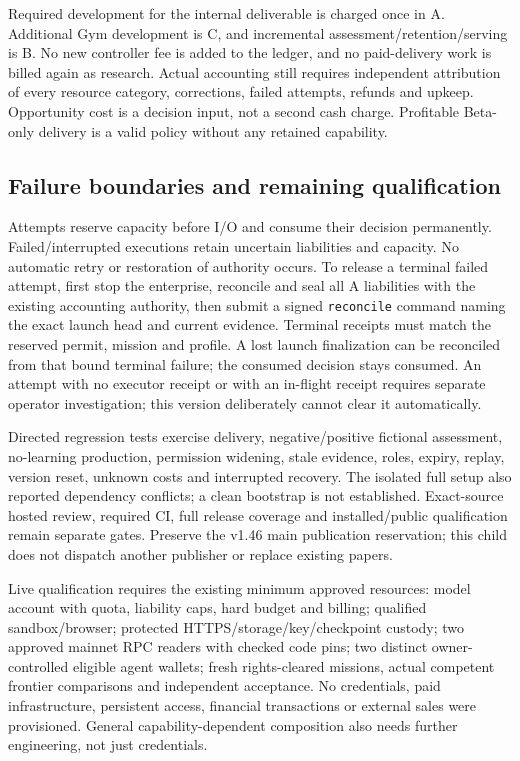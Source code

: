 \documentclass[
  10pt,
]{article}
\begin{document}
Required development for the internal deliverable is charged once in A.
Additional Gym development is C, and incremental
assessment/retention/serving is B. No new controller fee is added to the
ledger, and no paid-delivery work is billed again as research. Actual
accounting still requires independent attribution of every resource
category, corrections, failed attempts, refunds and upkeep. Opportunity
cost is a decision input, not a second cash charge. Profitable Beta-only
delivery is a valid policy without any retained capability.

\hypertarget{failure-boundaries-and-remaining-qualification}{%
\subsection{Failure boundaries and remaining
qualification}\label{failure-boundaries-and-remaining-qualification}}

Attempts reserve capacity before I/O and consume their decision
permanently. Failed/interrupted executions retain uncertain liabilities
and capacity. No automatic retry or restoration of authority occurs. To
release a terminal failed attempt, first stop the enterprise, reconcile
and seal all A liabilities with the existing accounting authority, then
submit a signed \texttt{reconcile} command naming the exact launch head
and current evidence. Terminal receipts must match the reserved permit,
mission and profile. A lost launch finalization can be reconciled from
that bound terminal failure; the consumed decision stays consumed. An
attempt with no executor receipt or with an in-flight receipt requires
separate operator investigation; this version deliberately cannot clear
it automatically.

Directed regression tests exercise delivery, negative/positive fictional
assessment, no-learning production, permission widening, stale evidence,
roles, expiry, replay, version reset, unknown costs and interrupted
recovery. The isolated full setup also reported dependency conflicts; a
clean bootstrap is not established. Exact-source hosted review, required
CI, full release coverage and installed/public qualification remain
separate gates. Preserve the v1.46 main publication reservation; this
child does not dispatch another publisher or replace existing papers.

Live qualification requires the existing minimum approved resources:
model account with quota, liability caps, hard budget and billing;
qualified sandbox/browser; protected HTTPS/storage/key/checkpoint
custody; two approved mainnet RPC readers with checked code pins; two
distinct owner-controlled eligible agent wallets; fresh rights-cleared
missions, actual competent frontier comparisons and independent
acceptance. No credentials, paid infrastructure, persistent access,
financial transactions or external sales were provisioned. General
capability-dependent composition also needs further engineering, not
just credentials.
\end{document}
